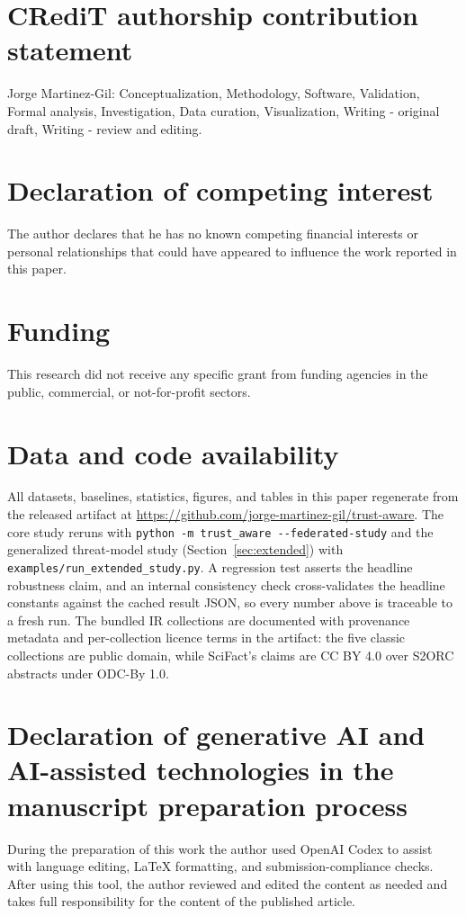 \documentclass[preprint,12pt]{elsarticle}
\begin{document}
\section*{CRediT authorship contribution statement}
Jorge Martinez-Gil: Conceptualization, Methodology, Software, Validation, Formal
analysis, Investigation, Data curation, Visualization, Writing - original draft,
Writing - review and editing.

\section*{Declaration of competing interest}
The author declares that he has no known competing financial interests or
personal relationships that could have appeared to influence the work reported in
this paper.

\section*{Funding}
This research did not receive any specific grant from funding agencies in the
public, commercial, or not-for-profit sectors.

\section*{Data and code availability}
All datasets, baselines, statistics, figures, and tables in this paper regenerate
from the released artifact at
\url{https://github.com/jorge-martinez-gil/trust-aware}. The core study reruns
with \texttt{python -m trust\_aware -{}-federated-study} and the generalized
threat-model study (Section~\ref{sec:extended}) with
\texttt{examples/run\_extended\_study.py}. A regression test asserts the headline
robustness claim, and an internal consistency check cross-validates the headline
constants against the cached result JSON, so every number above is traceable to a
fresh run. The bundled IR collections are documented with provenance metadata
and per-collection licence terms in the artifact: the five classic collections are
public domain, while SciFact's claims are CC BY 4.0 over S2ORC abstracts under
ODC-By 1.0.

\section*{Declaration of generative AI and AI-assisted technologies in the
manuscript preparation process}
During the preparation of this work the author used OpenAI Codex to assist with
language editing, LaTeX formatting, and submission-compliance checks. After using
this tool, the author reviewed and edited the content as needed and takes full
responsibility for the content of the published article.
\end{document}
